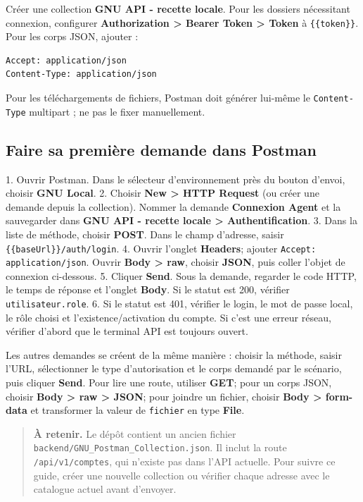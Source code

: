 \documentclass[10pt,a4paper]{article}
\newcommand{\note}[1]{\begin{quote}\colorbox{gnuPale}{\parbox{0.94\linewidth}{\textbf{À retenir. }#1}}\end{quote}}
\begin{document}
Créer une collection \textbf{GNU API - recette locale}. Pour les dossiers nécessitant connexion, configurer \textbf{Authorization > Bearer Token > Token} à \texttt{\{\{token\}\}}. Pour les corps JSON, ajouter :
\begin{lstlisting}
Accept: application/json
Content-Type: application/json
\end{lstlisting}

Pour les téléchargements de fichiers, Postman doit générer lui-même le \texttt{Content-Type} multipart ; ne pas le fixer manuellement.

\subsection{Faire sa première demande dans Postman}

1. Ouvrir Postman. Dans le sélecteur d’environnement près du bouton d’envoi, choisir \textbf{GNU Local}.
2. Choisir \textbf{New > HTTP Request} (ou créer une demande depuis la collection). Nommer la demande \textbf{Connexion Agent} et la sauvegarder dans \textbf{GNU API - recette locale > Authentification}.
3. Dans la liste de méthode, choisir \textbf{POST}. Dans le champ d’adresse, saisir \texttt{\{\{baseUrl\}\}/auth/login}.
4. Ouvrir l’onglet \textbf{Headers}; ajouter \texttt{Accept: application/json}. Ouvrir \textbf{Body > raw}, choisir \textbf{JSON}, puis coller l’objet de connexion ci-dessous.
5. Cliquer \textbf{Send}. Sous la demande, regarder le code HTTP, le temps de réponse et l’onglet \textbf{Body}. Si le statut est 200, vérifier \texttt{utilisateur.role}.
6. Si le statut est 401, vérifier le login, le mot de passe local, le rôle choisi et l’existence/activation du compte. Si c’est une erreur réseau, vérifier d’abord que le terminal API est toujours ouvert.

Les autres demandes se créent de la même manière : choisir la méthode, saisir l’URL, sélectionner le type d’autorisation et le corps demandé par le scénario, puis cliquer \textbf{Send}. Pour lire une route, utiliser \textbf{GET}; pour un corps JSON, choisir \textbf{Body > raw > JSON}; pour joindre un fichier, choisir \textbf{Body > form-data} et transformer la valeur de \texttt{fichier} en type \textbf{File}.

\note{Le dépôt contient un ancien fichier \texttt{backend/GNU\_Postman\_Collection.json}. Il inclut la route \texttt{/api/v1/comptes}, qui n’existe pas dans l’API actuelle. Pour suivre ce guide, créer une nouvelle collection ou vérifier chaque adresse avec le catalogue actuel avant d’envoyer.}
\end{document}
